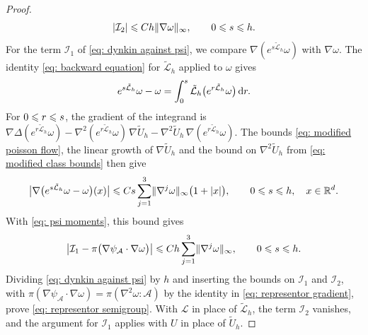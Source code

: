 \begin{proof}
    \begin{equation*}
        | \mathcal I_2 | \leqslant C h \lVert \nabla \omega \rVert_\infty , \qquad 0 \leqslant s \leqslant h .
    \end{equation*}
    For the term $\mathcal I_1$ of \eqref{eq: dynkin against psi}, we compare $\nabla ( e^{s\tilde{\mathcal L}_h} \omega )$ with $\nabla \omega$. The identity \eqref{eq: backward equation} for $\tilde{\mathcal L}_h$ applied to $\omega$ gives
    \begin{equation*}
        e^{s\tilde{\mathcal L}_h} \omega - \omega = \int_0^s \tilde{\mathcal L}_h \bigl( e^{r\tilde{\mathcal L}_h} \omega \bigr)\, \mathrm{d} r .
    \end{equation*}
    For $0 \leqslant r \leqslant s$, the gradient of the integrand is $\nabla \Delta ( e^{r\tilde{\mathcal L}_h} \omega ) - \nabla^2 ( e^{r\tilde{\mathcal L}_h} \omega )\, \nabla \tilde U_h - \nabla^2 \tilde U_h\, \nabla ( e^{r\tilde{\mathcal L}_h} \omega )$. The bounds \eqref{eq: modified poisson flow}, the linear growth of $\nabla \tilde U_h$ and the bound on $\nabla^2 \tilde U_h$ from \eqref{eq: modified class bounds} then give
    \begin{equation*}
        \bigl| \nabla \bigl( e^{s\tilde{\mathcal L}_h} \omega - \omega \bigr)(x) \bigr| \leqslant C s \sum_{j=1}^{3} \lVert \nabla^j \omega \rVert_\infty \bigl( 1 + |x| \bigr) , \qquad 0 \leqslant s \leqslant h , \quad x \in \mathbb R^d .
    \end{equation*}
    With \eqref{eq: psi moments}, this bound gives
    \begin{equation*}
        \bigl| \mathcal I_1 - \pi\bigl( \nabla \psi_{\mathcal A} \cdot \nabla \omega \bigr) \bigr| \leqslant C h \sum_{j=1}^{3} \lVert \nabla^j \omega \rVert_\infty , \qquad 0 \leqslant s \leqslant h .
    \end{equation*}
    Dividing \eqref{eq: dynkin against psi} by $h$ and inserting the bounds on $\mathcal I_1$ and $\mathcal I_2$, with $\pi( \nabla \psi_{\mathcal A} \cdot \nabla \omega ) = \pi( \nabla^2 \omega : \mathcal A )$ by the identity in \eqref{eq: representor gradient}, prove \eqref{eq: representor semigroup}. With $\mathcal L$ in place of $\tilde{\mathcal L}_h$, the term $\mathcal I_2$ vanishes, and the argument for $\mathcal I_1$ applies with $U$ in place of $\tilde U_h$.
\end{proof}


